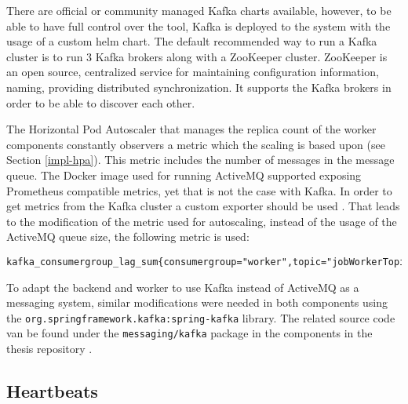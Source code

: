 There are official or community managed Kafka charts available, however, to be able to have full control over the tool, Kafka is deployed to the system with the usage of a custom helm chart. The default recommended way to run a Kafka cluster is to run 3 Kafka brokers along with a ZooKeeper cluster. ZooKeeper \cite{ZooKeeper} is an open source, centralized service for maintaining configuration information, naming, providing distributed synchronization. It supports the Kafka brokers in order to be able to discover each other.

The Horizontal Pod Autoscaler that manages the replica count of the worker components constantly observers a metric which the scaling is based upon (see Section \ref{impl-hpa}). This metric includes the number of messages in the message queue. The Docker image used for running ActiveMQ supported exposing Prometheus compatible metrics, yet that is not the case with Kafka. In order to get metrics from the Kafka cluster a custom exporter should be used \cite{KafkaExporter}. That leads to the modification of the metric used for autoscaling, instead of the usage of the ActiveMQ queue size, the following metric is used:


\vspace{0.5cm}
\begin{minipage}{\linewidth}
	\begin{lstlisting}[caption={Metric for the number of unconsumed messages in Kafka}, label={lst:kafka-consumerlag-metric}]
	kafka_consumergroup_lag_sum{consumergroup="worker",topic="jobWorkerTopic"}\end{lstlisting}
\end{minipage}

To adapt the backend and worker to use Kafka instead of ActiveMQ as a messaging system, similar modifications were needed in both components using the \texttt{org.springframework.kafka:spring-kafka} library. The related source code van be found under the \texttt{messaging/kafka} package in the components in the thesis repository \cite{ThesisRepo}.

\subsection{Heartbeats}


